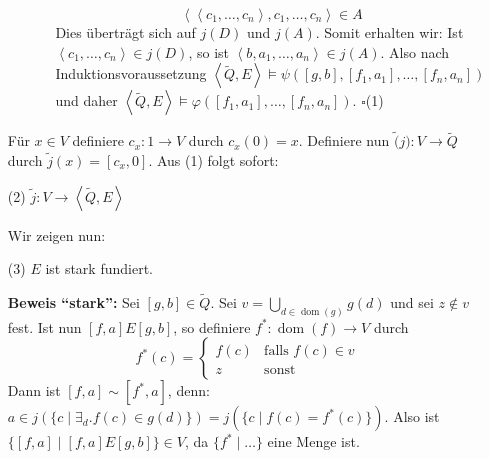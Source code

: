 \documentclass[a4paper,fontsize=11pt]{scrartcl}
\newcommand{\dom}{\operatorname{dom}}
\begin{document}
\begin{itemize}
\begin{itemize}
\begin{itemize}
$$            \left<\left<c_1,\ldots,c_n\right>,c_1,\ldots,c_n\right>\in A$$ Dies überträgt sich auf $j(D)$ und $j(A)$. Somit erhalten wir: Ist
            $\left<c_1,\ldots,c_n\right>\in j(D)$, so ist $\left<b,a_1,\ldots,a_n\right>\in j(A)$. Also nach Induktionsvoraussetzung
            $\left<\tilde{Q},E\right>\models\psi([g,b],[f_1,a_1],\ldots,[f_n,a_n])$ und daher
            $\left<\tilde{Q},E\right>\models\varphi([f_1,a_1],\ldots,[f_n,a_n])$. \hfill $\square$(1)
        \end{itemize}
    \end{itemize}
  \item[] Für $x\in V$ definiere $c_x:1\rightarrow V$ durch $c_x(0)=x$. Definiere nun $\tilde(j):V\rightarrow\tilde{Q}$ durch
    $\tilde{j}(x)=[c_x,0]$. Aus (1) folgt sofort:
  \item[(2)] $\tilde{j}:V\rightarrow\left<\tilde{Q},E\right>$
  \item[] Wir zeigen nun:
  \item[(3)] $E$ ist stark fundiert.
  \item[] {\bf Beweis ``stark'':} Sei $[g,b]\in\tilde{Q}$. Sei $v=\bigcup\limits_{d\in\dom(g)}g(d)$ und sei $z\not\in v$ fest. Ist nun $[f,a]E[g,b]$,
    so definiere $f^*:\dom(f)\rightarrow V$ durch $$ f^*(c) = \left\{ \begin{array}{cl} f(c) & \mbox{falls } f(c)\in v \\ z &
      \mbox{sonst}\end{array}\right.$$ Dann ist $[f,a]\sim[f^*,a]$, denn: $a\in j(\{c\mid\exists_d . f(c)\in g(d)\}) = j(\{c\mid f(c)=f^*(c)\})$. Also
    ist $\{[f,a]\mid [f,a]E[g,b]\}\in V$, da $\{f^*\mid\ldots\}$ eine Menge ist.



\end{itemize}
\end{document}
